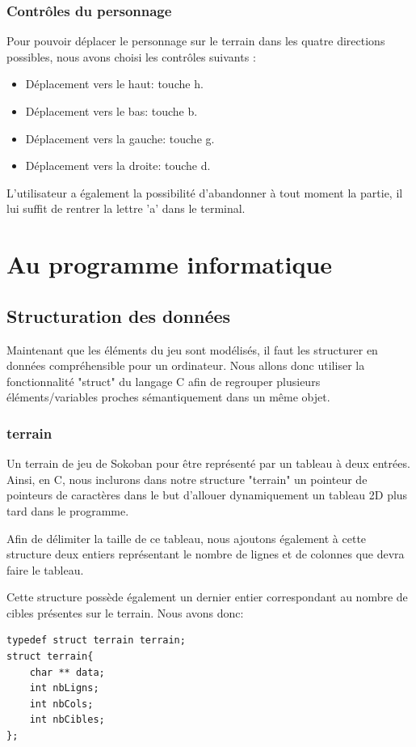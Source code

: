 \documentclass[10pt,a4paper,french,titlepage]{article}
\begin{document}
\subsubsection{Contrôles du personnage}
Pour pouvoir déplacer le personnage sur le terrain dans les quatre directions possibles, nous avons choisi les contrôles suivants :
\begin{itemize}
\item Déplacement vers le haut: touche h.
\item Déplacement vers le bas: touche b.
\item Déplacement vers la gauche: touche g.
\item Déplacement vers la droite: touche d.
\end{itemize}
L'utilisateur a également la possibilité d'abandonner à tout moment la partie, il lui suffit de rentrer la lettre 'a' dans le terminal.
\newpage
\section{Au programme informatique}
\subsection{Structuration des données}\label{struct}
Maintenant que les éléments du jeu sont modélisés, il faut les structurer en données compréhensible pour un ordinateur. Nous allons donc utiliser la fonctionnalité "struct" du langage C afin de regrouper plusieurs éléments/variables proches sémantiquement dans un même objet.
\subsubsection{terrain}
Un terrain de jeu de Sokoban pour être représenté par un tableau à deux entrées. Ainsi, en C, nous inclurons dans notre structure "terrain" un pointeur de pointeurs de caractères dans le but d'allouer dynamiquement un tableau 2D plus tard dans le programme. 

Afin de délimiter la taille de ce tableau, nous ajoutons également à cette structure deux entiers représentant le nombre de lignes et de colonnes que devra faire le tableau. 

Cette structure possède également un dernier entier correspondant au nombre de cibles présentes sur le terrain.
Nous avons donc:
\begin{lstlisting}
typedef struct terrain terrain;
struct terrain{
    char ** data;
    int nbLigns;
    int nbCols;
    int nbCibles;
};
\end{lstlisting}
\end{document}
